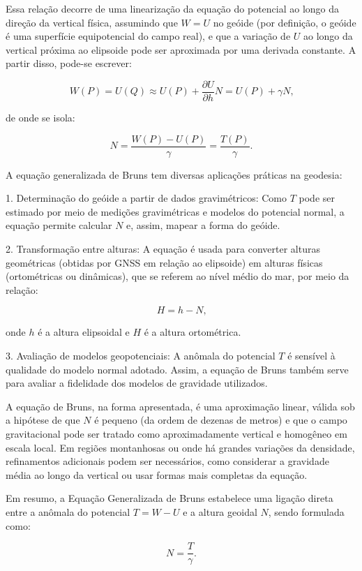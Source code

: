 Essa relação decorre de uma linearização da equação do potencial ao longo da direção da vertical física, assumindo que \( W = U \) no geóide (por definição, o geóide é uma superfície equipotencial do campo real), e que a variação de \( U \) ao longo da vertical próxima ao elipsoide pode ser aproximada por uma derivada constante. A partir disso, pode-se escrever:

\[
W(P) = U(Q) \approx U(P) + \frac{\partial U}{\partial h} N = U(P) + \gamma N \text{,}
\]

de onde se isola:

\[
N = \frac{W(P) - U(P)}{\gamma} = \frac{T(P)}{\gamma} \text{.}
\]

A equação generalizada de Bruns tem diversas aplicações práticas na geodesia:

1. Determinação do geóide a partir de dados gravimétricos: Como \( T \) pode ser estimado por meio de medições gravimétricas e modelos do potencial normal, a equação permite calcular \( N \) e, assim, mapear a forma do geóide.

2. Transformação entre alturas: A equação é usada para converter alturas geométricas (obtidas por GNSS em relação ao elipsoide) em alturas físicas (ortométricas ou dinâmicas), que se referem ao nível médio do mar, por meio da relação:

   \[
   H = h - N \text{,}
   \]

   onde \( h \) é a altura elipsoidal e \( H \) é a altura ortométrica.

3. Avaliação de modelos geopotenciais: A anômala do potencial \( T \) é sensível à qualidade do modelo normal adotado. Assim, a equação de Bruns também serve para avaliar a fidelidade dos modelos de gravidade utilizados.

A equação de Bruns, na forma apresentada, é uma aproximação linear, válida sob a hipótese de que \( N \) é pequeno (da ordem de dezenas de metros) e que o campo gravitacional pode ser tratado como aproximadamente vertical e homogêneo em escala local. Em regiões montanhosas ou onde há grandes variações da densidade, refinamentos adicionais podem ser necessários, como considerar a gravidade média ao longo da vertical ou usar formas mais completas da equação.

Em resumo, a Equação Generalizada de Bruns estabelece uma ligação direta entre a anômala do potencial \( T = W - U \) e a altura geoidal \( N \), sendo formulada como:

\[
N = \frac{T}{\gamma} \text{.}
\]

